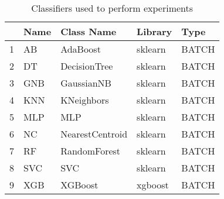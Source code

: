 \begin{table}
\footnotesize
\caption{Classifiers used to perform experiments}
\label{tab:algorithm}
\begin{tabular}{lllll}
\hline
 & Name & Class Name & Library & Type \\
\hline
1 & AB & AdaBoost & sklearn & BATCH \\
2 & DT & DecisionTree & sklearn & BATCH \\
3 & GNB & GaussianNB & sklearn & BATCH \\
4 & KNN & KNeighbors & sklearn & BATCH \\
5 & MLP & MLP & sklearn & BATCH \\
6 & NC & NearestCentroid & sklearn & BATCH \\
7 & RF & RandomForest & sklearn & BATCH \\
8 & SVC & SVC & sklearn & BATCH \\
9 & XGB & XGBoost & xgboost & BATCH \\
\hline
\end{tabular}
\end{table}
